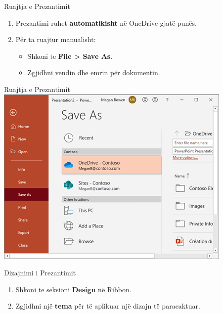 \documentclass[
  ignorenonframetext,
]{beamer}
\begin{document}
\begin{frame}{Ruajtja e Prezantimit}
\label{ruajtja-e-prezantimit}
\begin{enumerate}
\item
  Prezantimi ruhet \textbf{automatikisht} në OneDrive gjatë punës.
\item
  Për ta ruajtur manualisht:

  \begin{itemize}
  \item
    Shkoni te \textbf{File \textgreater{} Save As}.
  \item
    Zgjidhni vendin dhe emrin për dokumentin.
  \end{itemize}
\end{enumerate}
\end{frame}

\begin{frame}{Ruajtja e Prezantimit}
\label{ruajtja-e-prezantimit-1}
\includegraphics{./images/powerpoint2.png}
\end{frame}

\begin{frame}{Dizajnimi i Prezantimit}
\label{dizajnimi-i-prezantimit}
\begin{enumerate}
\item
  Shkoni te seksioni \textbf{Design} në Ribbon.
\item
  Zgjidhni një \textbf{tema} për të aplikuar një dizajn të paracaktuar.
\end{enumerate}
\end{frame}
\end{document}
